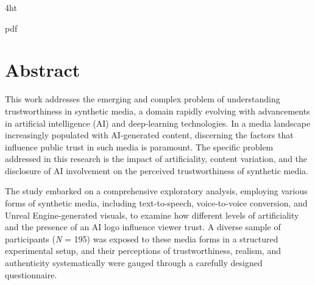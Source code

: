 \documentclass[
  a4paper,  %
  twoside,  %
  bibliography=totoc,
  headsepline,
  cleardoublepage=empty,
  parskip=half,
  draft=false
]{scrbook}
\begin{document}
\frontmatter
{} %
\setcounter{tocdepth}{2} %



\iftex4ht
  \Configure{$}{\PicMath}{\EndPicMath}{}

  {pdf}
  {%
  }
\fi



\Coverpage
\Copyright
\pagestyle{preamble}
\renewcommand*{\chapterpagestyle}{preamble}




\section*{Abstract}

This work addresses the emerging and complex problem of understanding trustworthiness in synthetic media, a domain rapidly evolving with advancements in artificial intelligence (AI) and deep-learning technologies. In a media landscape increasingly populated with AI-generated content, discerning the factors that influence public trust in such media is paramount. The specific problem addressed in this research is the impact of artificiality, content variation, and the disclosure of AI involvement on the perceived trustworthiness of synthetic media.

The study embarked on a comprehensive exploratory analysis, employing various forms of synthetic media, including text-to-speech, voice-to-voice conversion, and Unreal Engine-generated visuals, to examine how different levels of artificiality and the presence of an AI logo influence viewer trust. A diverse sample of participants (\textit{N} = 195) was exposed to these media forms in a structured experimental setup, and their perceptions of trustworthiness, realism, and authenticity systematically were gauged through a carefully designed questionnaire.
\end{document}
